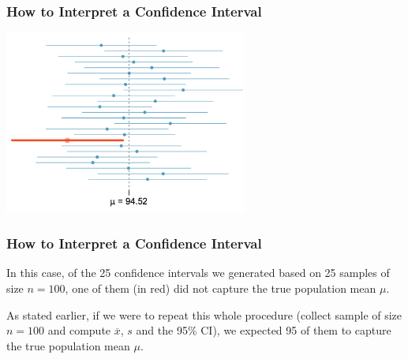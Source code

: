 \documentclass[handout]{beamer}
\newcommand{\blue}[1]{\textcolor{blue2}{#1}}
\newcommand{\xbar}{\overline{x}}
\begin{document}
\begin{frame}
\frametitle{How to Interpret a Confidence Interval}

\begin{center}
\includegraphics[width=8cm]{figure/CI.png}
\end{center}

\end{frame}


\begin{frame}
\frametitle{How to Interpret a Confidence Interval}
In this case, of the 25 confidence intervals we generated based on 25 samples of size $n=100$, one of them (in red) did not capture the true population mean $\mu$.

\vspace{0.5cm}

\pause As stated earlier, if we were to \blue{repeat this whole procedure} (collect sample of size $n=100$ and compute $\xbar$, $s$ and the 95\% CI), we expected 95 of them to capture the true population mean $\mu$.  

\end{frame}
\end{document}

